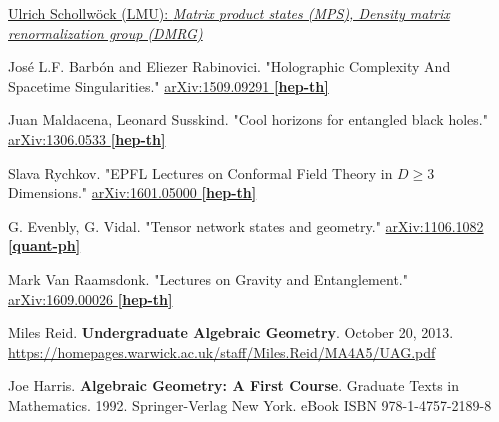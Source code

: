 \documentclass[10pt]{amsart}
\begin{document}
\begin{thebibliography}{9}
\href{https://www.asc.physik.lmu.de/activities/schools/archiv/asc_school_17/extramaterial/schollwoeck_asc_2.pdf}{Ulrich Schollw\"{o}ck (LMU): \emph{Matrix product states (MPS), Density matrix renormalization group (DMRG)}}


Jos\'{e} L.F. Barb\'{o}n and Eliezer Rabinovici.  "Holographic Complexity And Spacetime Singularities."  \href{https://arxiv.org/abs/1509.09291v3}{arXiv:1509.09291 \textbf{[hep-th]}}

Juan Maldacena, Leonard Susskind.  "Cool horizons for entangled black holes."  \href{https://arxiv.org/abs/1306.0533}{ 	arXiv:1306.0533 \textbf{[hep-th]}}

Slava Rychkov.  "EPFL Lectures on Conformal Field Theory in $D \geq 3$ Dimensions."    \href{https://arxiv.org/abs/1601.05000}{arXiv:1601.05000 \textbf{[hep-th]}}

G. Evenbly, G. Vidal.  "Tensor network states and geometry."  \href{https://arxiv.org/abs/1106.1082}{arXiv:1106.1082 \textbf{[quant-ph]}}

Mark Van Raamsdonk.  "Lectures on Gravity and Entanglement."  \href{https://arxiv.org/abs/1609.00026}{arXiv:1609.00026 \textbf{[hep-th]}}


Miles Reid. \textbf{Undergraduate Algebraic Geometry}. October 20, 2013. \url{https://homepages.warwick.ac.uk/staff/Miles.Reid/MA4A5/UAG.pdf}

Joe Harris. \textbf{Algebraic Geometry: A First Course}. Graduate Texts in Mathematics. 1992. Springer-Verlag New York.   eBook ISBN 978-1-4757-2189-8
    




\end{thebibliography}
\end{document}
